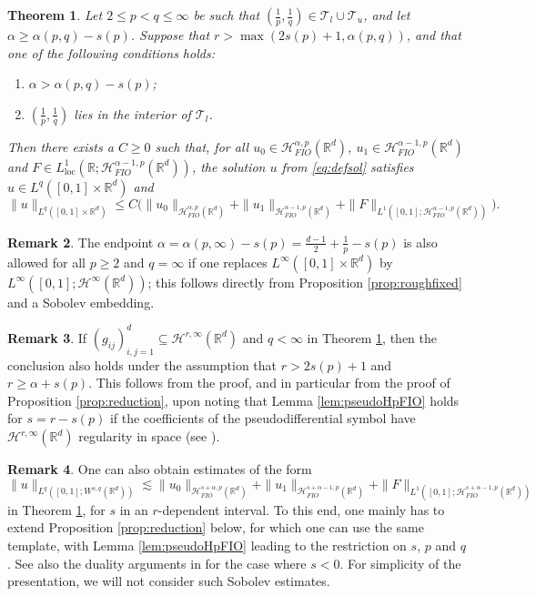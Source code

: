 \documentclass{amsart}
\numberwithin{equation}{section}
\newtheorem{theorem}{Theorem}[section]
\theoremstyle{definition}
\newtheorem{remark}[theorem]{Remark}
\newcommand{\R}{\mathbb{R}}
\newcommand{\Rd}{\mathbb{R}^{d}}
\newcommand {\HT}{\mathcal{H}}
\newcommand {\loc}{\mathrm{loc}}
\begin{document}
\begin{theorem}\label{thm:mainrough}
Let $2\leq p<q\leq \infty$ be such that $(\frac{1}{p},\frac{1}{q})\in \mathcal{T}_{l}\cup \mathcal{T}_{u}$, and let $\alpha\geq \alpha(p,q)-s(p)$. Suppose that $r>\max(2s(p)+1,\alpha(p,q))$, and that one of the following conditions holds:
\begin{enumerate}
\item\label{it:mainrough1} $\alpha>\alpha(p,q)-s(p)$; 
\item\label{it:mainrough2} $(\frac{1}{p},\frac{1}{q})$ lies in the interior of $\mathcal{T}_{l}$. 
\end{enumerate} 
Then there exists a $C\geq0$ such that, for all $u_{0}\in \HT^{\alpha,p}_{FIO}(\R^d)$, $u_{1}\in \HT^{\alpha-1,p}_{FIO}(\R^d)$ and $F\in L^{1}_{\loc}(\R;\HT^{\alpha-1,p}_{FIO}(\R^d))$, the solution $u$ from \eqref{eq:defsol} satisfies $u\in L^{q}([0,1]\times\R^d)$ and
\[
\|u\|_{L^{q}([0,1]\times \R^d)}\leq C\big(\|u_{0}\|_{\HT^{\alpha,p}_{FIO}(\R^d)}+\|u_{1}\|_{\HT^{\alpha-1,p}_{FIO}(\R^d)}+\|F\|_{L^{1}([0,1];\HT^{\alpha-1,p}_{FIO}(\R^d))}\big).
\]
\end{theorem}

\begin{remark}\label{rem:dyadicestimates}
The endpoint $\alpha=\alpha(p,\infty)-s(p)=\frac{d-1}{2}+\frac{1}{p}-s(p)$ is also allowed for all $p\geq 2$ and $q=\infty$ if one replaces $L^{\infty}([0,1]\times\Rd)$ by $L^{\infty}([0,1];\HT^{\infty}(\Rd))$; this follows directly from Proposition \ref{prop:roughfixed} and a Sobolev embedding.
\end{remark}

\begin{remark}\label{rem:sqinfty}
If $(g_{ij})_{i,j=1}^{d}\subseteq \HT^{r,\infty}(\Rd)$ and $q<\infty$ in Theorem \ref{thm:mainrough}, then the conclusion also holds under the assumption that $r>2s(p)+1$ and $r\geq \alpha+s(p)$. This follows from the proof, and in particular from the proof of Proposition \ref{prop:reduction}, upon noting that Lemma \ref{lem:pseudoHpFIO} holds for $s=r-s(p)$ if the coefficients of the pseudodifferential symbol have $\HT^{r,\infty}(\Rd)$ regularity in space (see \cite[Theorem 3.19]{LiRoSo25a}).
\end{remark}

\begin{remark}\label{rem:Sobolevreg}
One can also obtain estimates of the form
\[
\|u\|_{L^{q}([0,1];W^{s,q}(\Rd))}\lesssim\|u_{0}\|_{\HT^{s+\alpha,p}_{FIO}(\R^d)}+\|u_{1}\|_{\HT^{s+\alpha-1,p}_{FIO}(\R^d)}+\|F\|_{L^{1}([0,1];\HT^{s+\alpha-1,p}_{FIO}(\R^d))}
\]
in Theorem \ref{thm:mainrough}, for $s$ in an $r$-dependent interval. To this end, one mainly has to extend Proposition \ref{prop:reduction} below, for which one can use the same template, with Lemma \ref{lem:pseudoHpFIO} leading to the restriction on $s$, $p$ and $q$. See also the duality arguments in \cite{LiRoSo25a} for the case where $s<0$.
For simplicity of the presentation, we will not consider such Sobolev estimates.
\end{remark}
\end{document}
